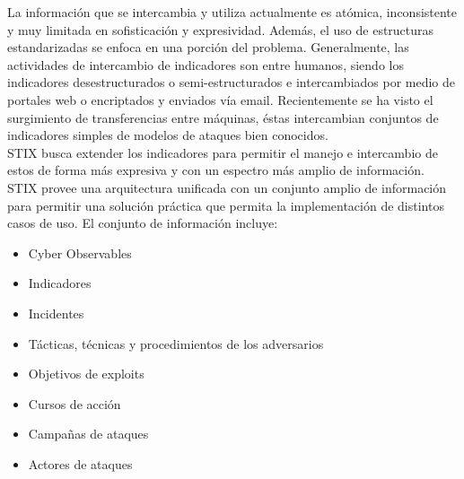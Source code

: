 La información que se intercambia y utiliza actualmente es atómica, inconsistente 
y muy limitada en sofisticación y expresividad. Además, el uso de estructuras 
estandarizadas se enfoca en una porción del problema. %
Generalmente, las actividades de intercambio de indicadores son entre humanos, 
siendo los indicadores desestructurados o semi-estructurados e intercambiados 
por medio de portales web o encriptados y enviados vía email. Recientemente se 
ha visto el surgimiento de transferencias entre máquinas, éstas intercambian 
conjuntos de indicadores simples de modelos de ataques bien conocidos.\\


STIX busca extender los indicadores para permitir el manejo e intercambio de 
estos de forma más expresiva y con un espectro más amplio de información.\\

STIX provee una arquitectura unificada con un conjunto amplio de información 
para permitir una solución práctica que permita la implementación de distintos 
casos de uso. El conjunto de información incluye:
\begin{itemize}
  \item Cyber Observables
  \item Indicadores
  \item Incidentes
  \item Tácticas, técnicas y procedimientos de los adversarios
  \item Objetivos de exploits
  \item Cursos de acción
  \item Campañas de ataques
  \item Actores de ataques
\end{itemize}

